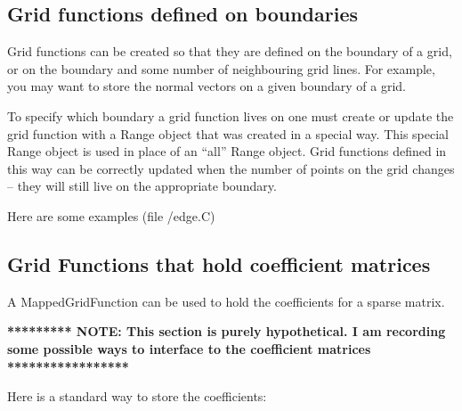 \subsection{Grid functions defined on boundaries}

Grid functions can be created so that they are defined on the boundary of a grid, or on 
the boundary and some number of neighbouring grid lines. 
For example, you may want to store the normal vectors on a given boundary of a grid.

To specify which boundary a grid function lives on one must create or update the grid
function with a Range object that was created in a special way. This special Range 
object is used in place of an ``all'' Range object.
Grid functions defined in this way can be correctly updated when the number of 
points on the grid changes -- they will still live on the appropriate boundary.

Here are some examples
(file {\ff \gf/edge.C})
{\footnotesize
{}
}



\subsection{Grid Functions that hold coefficient matrices}



A MappedGridFunction can be used to hold the coefficients for a sparse matrix.

{\bf ********** NOTE: This section is purely hypothetical. I am recording
some possible ways to interface to the coefficient matrices *****************}

Here is a standard way to store the coefficients:

